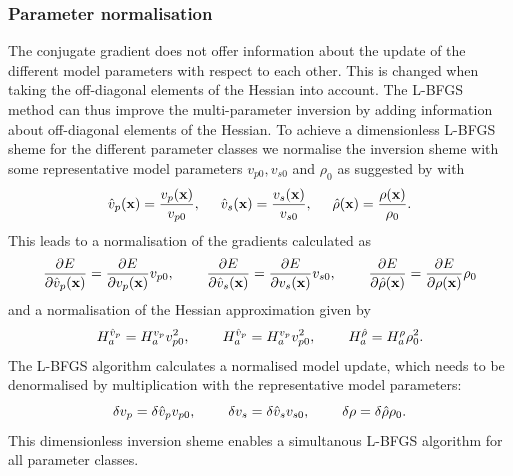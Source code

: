 \subsubsection*{Parameter normalisation}
The conjugate gradient does not offer information about the update of the different model parameters with respect to each other. This is changed when taking the off-diagonal elements of the Hessian into account. The L-BFGS method can thus improve the multi-parameter inversion by adding information about off-diagonal elements of the Hessian. To achieve a dimensionless L-BFGS sheme for the different parameter classes we normalise the inversion sheme with some representative model parameters $v_{p0}, v_{s0}$ and $\rho_{0}$ as suggested by \cite{Bro11} with   
\begin{equation}
 \hat v_p(\textbf x)=\frac{v_p(\textbf x)}{v_{p0}}, \hspace{0.5cm}\hat v_s(\textbf x)=\frac{v_s(\textbf x)}{v_{s0}}, \hspace{0.5cm}\hat \rho(\textbf x)=\frac{\rho(\textbf x)}{\rho_{0}}. 
\end{equation}
This leads to a normalisation of the gradients calculated as
\begin{equation}
 \frac{\partial E}{\partial\hat v_p(\textbf x)}=\frac{\partial E}{\partial v_p(\textbf x)}v_{p0},\hspace{0.8cm}\frac{\partial E}{\partial\hat v_s(\textbf x)}=\frac{\partial E}{\partial v_s(\textbf x)}v_{s0},\hspace{0.8cm}\frac{\partial E}{\partial\hat\rho(\textbf x)}=\frac{\partial E}{\partial \rho(\textbf x)}\rho_0
\end{equation}
and a normalisation of the Hessian approximation given by
\begin{equation}
 H_a^{\hat v_p}=H_a^{v_p}v_{p0}^2, \hspace{0.8cm} H_a^{\hat v_p}=H_a^{v_p}v_{p0}^2, \hspace{0.8cm} H_a^{\hat \rho}=H_a^{\rho}\rho_0^2.
\end{equation}
The L-BFGS algorithm calculates a normalised model update, which needs to be denormalised by multiplication with the representative model parameters:
\begin{equation}
\delta v_p=\delta\hat v_p v_{p0}, \hspace{0.8cm} \delta v_s=\delta\hat v_s v_{s0}, \hspace{0.8cm} \delta\rho=\delta\hat\rho\rho_0.
\end{equation}
This dimensionless inversion sheme enables a simultanous L-BFGS algorithm for all parameter classes.
